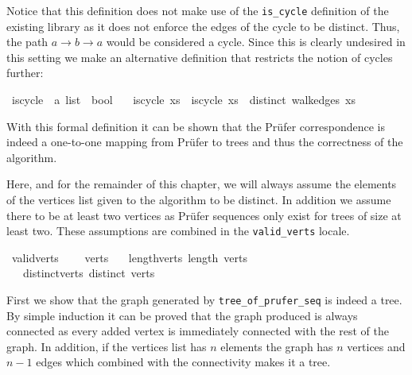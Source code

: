 Notice that this definition does not make use of the \texttt{is\_cycle} definition of the existing library as it does not enforce the edges of the cycle to be distinct.
Thus, the path $a\rightarrow b\rightarrow a$ would be considered a cycle.
Since this is clearly undesired in this setting we make an alternative definition that restricts the notion of cycles further:

\begin{isabellebox}
    \isamarkupfalse%
    \ is{\isacharunderscore}{\kern0pt}cycle{}\ {\isacharcolon}{\kern0pt}{\isacharcolon}{\kern0pt}\ {\isachardoublequoteopen}{\isacharprime}{\kern0pt}a\ list\ {\isasymRightarrow}\ bool{\isachardoublequoteclose}\ \isanewline
    \ \ {\isachardoublequoteopen}is{\isacharunderscore}{\kern0pt}cycle{}\ xs\ {\isasymlongleftrightarrow}\ is{\isacharunderscore}{\kern0pt}cycle\ xs\ {\isasymand}\ distinct\ {\isacharparenleft}{\kern0pt}walk{\isacharunderscore}{\kern0pt}edges\ xs{\isacharparenright}{\kern0pt}{\isachardoublequoteclose}
\end{isabellebox}

With this formal definition it can be shown that the Prüfer correspondence is indeed a one-to-one mapping from Prüfer to trees and thus the correctness of the algorithm.

Here, and for the remainder of this chapter, we will always assume the elements of the vertices list given to the algorithm to be distinct.
In addition we assume there to be at least two vertices as Prüfer sequences only exist for trees of size at least two.
These assumptions are combined in the \texttt{valid\_verts} locale.

\begin{isabellebox}
    \isamarkupfalse%
    \ valid{\isacharunderscore}{\kern0pt}verts\ {\isacharequal}{\kern0pt}\isanewline
    \ \ \ verts\isanewline
    \ \ \ length{\isacharunderscore}{\kern0pt}verts{\isacharcolon}{\kern0pt}\ {\isachardoublequoteopen}length\ verts\ {\isasymge}\ {}{\isachardoublequoteclose}\isanewline
    \ \ \ distinct{\isacharunderscore}{\kern0pt}verts{\isacharcolon}{\kern0pt}\ {\isachardoublequoteopen}distinct\ verts{\isachardoublequoteclose}
\end{isabellebox}

First we show that the graph generated by \texttt{tree\_of\_prufer\_seq} is indeed a tree.
By simple induction it can be proved that the graph produced is always connected as every added vertex is immediately connected with the rest of the graph.
In addition, if the vertices list has $n$ elements the graph has $n$ vertices and $n-1$ edges which combined with the connectivity makes it a tree.

